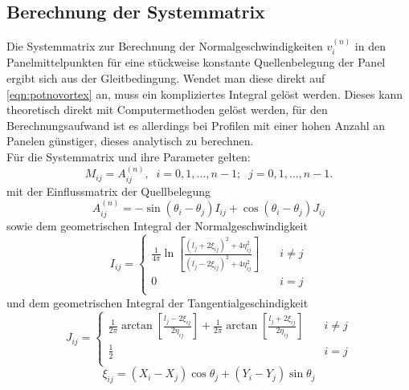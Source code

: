 \subsection{Berechnung der Systemmatrix}
\label{chap:systemmatrixtheory}
Die Systemmatrix zur Berechnung der Normalgeschwindigkeiten $v_i^{(n)}$ in den Panelmittelpunkten für eine stückweise konstante Quellenbelegung der Panel ergibt sich aus der Gleitbedingung. Wendet man diese direkt auf \eqref{eqn:potnovortex} an, muss ein kompliziertes Integral gelöst werden. Dieses kann theoretisch direkt mit Computermethoden gelöst werden, für den Berechnungsaufwand ist es allerdings bei Profilen mit einer hohen Anzahl an Panelen günstiger, dieses analytisch zu berechnen. \\
Für die Systemmatrix und ihre Parameter gelten:
\begin{equation}
\label{eq:mnovortex}
M_{ij} = A_{ij}^{(n)}, \;\; i = 0, 1, \ldots , n-1; \;\; j = 0,1,\ldots , n-1.
\end{equation}
mit der Einflussmatrix der Quellbelegung
\begin{equation}
\label{eq:An}
A_{ij}^{(n)} = -\sin {(\theta _i - \theta _j)} I_{ij} + \cos{(\theta _i - \theta _j)} J_{ij}
\end{equation}
sowie dem geometrischen Integral der Normalgeschwindigkeit
\begin{equation}
I_{ij} = 
     \begin{cases}
       \frac{1}{4\pi } \ln \left[ \frac{(l_j + 2 \xi_{ij})^2 + 4 \eta_{ij}^2}{(l_j -2 \xi _{ij})^2 + 4 \eta_{ij}^2} \right] &\quad i \neq j \\
       0 &\quad i = j \\
     \end{cases}
\end{equation}
und dem geometrischen Integral der Tangentialgeschindigkeit
\begin{equation}
J_{ij} = 
     \begin{cases}
       \frac{1}{2\pi } \arctan \left[ \frac{l_j - 2 \xi_{ij}}{2 \eta_{ij}} \right] + \frac{1}{2\pi } \arctan \left[ \frac{l_j + 2 \xi_{ij}}{2 \eta_{ij}} \right] &\quad i \neq j \\
       \frac{1}{2} &\quad i = j \\
     \end{cases}
\end{equation}
\begin{equation}
\label{eq:xi}
\xi_{ij} =  (X_i - X_j) \cos \theta _j + (Y_i - Y_j) \sin \theta _j
\end{equation}

